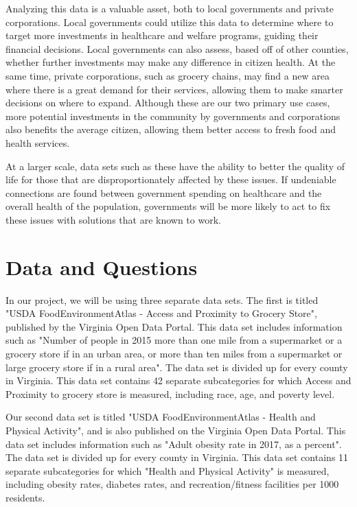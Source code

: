 \documentclass[11pt]{article}
\begin{document}
Analyzing this data is a valuable asset, both to local governments and private corporations. Local governments could utilize this data to determine where to target more investments in healthcare and welfare programs, guiding their financial decisions. Local governments can also assess, based off of other counties, whether further investments may make any difference in citizen health. At the same time, private corporations, such as grocery chains, may find a new area where there is a great demand for their services, allowing them to make smarter decisions on where to expand. Although these are our two primary use cases, more potential investments in the community by governments and corporations also benefits the average citizen, allowing them better access to fresh food and health services.

At a larger scale, data sets such as these have the ability to better the quality of life for those that are disproportionately affected by these issues. If undeniable connections are found between government spending on healthcare and the overall health of the population, governments will be more likely to act to fix these issues with solutions that are known to work.

 
\section*{Data and Questions}


In our project, we will be using three separate data sets. The first is titled "USDA FoodEnvironmentAtlas - Access and Proximity to Grocery Store", published by the Virginia Open Data Portal. This data set includes information such as "Number of people in 2015 more than one mile from a supermarket or a grocery store if in an urban area, or more than ten miles from a supermarket or large grocery store if in a rural area". The data set is divided up for every county in Virginia. This data set contains 42 separate subcategories for which Access and Proximity to grocery store is measured, including race, age, and poverty level.

Our second data set is titled "USDA FoodEnvironmentAtlas - Health and Physical Activity", and is also published on the Virginia Open Data Portal. This data set includes information such as "Adult obesity rate in 2017, as a percent". The data set is divided up for every county in Virginia. This data set contains 11 separate subcategories for which "Health and Physical Activity" is measured, including obesity rates, diabetes rates, and recreation/fitness facilities per 1000 residents.
\end{document}
